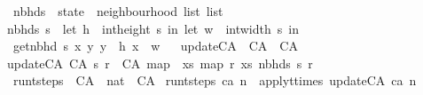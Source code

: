 \begin{isabellebody}
\isanewline
{}\isamarkupfalse%
\ nbhds\ {\isacharcolon}{\isacharcolon}\ {\isachardoublequoteopen}state\ {\isasymRightarrow}\ neighbourhood\ list\ list{\isachardoublequoteclose}\ \isanewline
{\isachardoublequoteopen}nbhds\ s\ {\isacharequal}\ {\isacharparenleft}let\ h\ {\isacharequal}\ {\isacharparenleft}int{\isacharunderscore}height\ s{\isacharparenright}{\isacharminus}{}\ in\ {\isacharparenleft}let\ w\ {\isacharequal}\ {\isacharparenleft}int{\isacharunderscore}width\ s{\isacharparenright}{\isacharminus}{}\ in\isanewline
\ {\isacharbrackleft}{\isacharbrackleft}get{\isacharunderscore}nbhd\ s\ x\ y{\isachardot}\ y\ {\isasymleftarrow}\ {\isacharbrackleft}{}{\isachardot}{\isachardot}h{\isacharbrackright}{\isacharbrackright}{\isachardot}\ x\ {\isasymleftarrow}\ {\isacharbrackleft}{}{\isachardot}{\isachardot}w{\isacharbrackright}{\isacharbrackright}{\isacharparenright}{\isacharparenright}{\isachardoublequoteclose}\isanewline
\isanewline
\ \isanewline
{}\isamarkupfalse%
\ update{\isacharunderscore}CA\ {\isacharcolon}{\isacharcolon}\ {\isachardoublequoteopen}CA\ {\isasymRightarrow}\ CA{\isachardoublequoteclose}\ \isanewline
{\isachardoublequoteopen}update{\isacharunderscore}CA\ {\isacharparenleft}CA\ s\ r{\isacharparenright}\ {\isacharequal}\ CA\ {\isacharparenleft}map\ {\isacharparenleft}{\isasymlambda}\ xs{\isachardot}\ map\ r\ xs{\isacharparenright}\ {\isacharparenleft}nbhds\ s{\isacharparenright}{\isacharparenright}\ r{\isachardoublequoteclose}\isanewline
\isanewline
{}\isamarkupfalse%
\ run{\isacharunderscore}t{\isacharunderscore}steps\ {\isacharcolon}{\isacharcolon}\ {\isachardoublequoteopen}CA\ {\isasymRightarrow}\ nat\ {\isasymRightarrow}\ CA{\isachardoublequoteclose}\ \isanewline
{\isachardoublequoteopen}run{\isacharunderscore}t{\isacharunderscore}steps\ ca\ n\ {\isacharequal}\ apply{\isacharunderscore}t{\isacharunderscore}times\ update{\isacharunderscore}CA\ ca\ n{\isachardoublequoteclose}\isanewline
%
\isadelimtheory
%
\endisadelimtheory
%
\isatagtheory
{}\isamarkupfalse%
%
\endisatagtheory
{\isafoldtheory}%
%
\isadelimtheory
%
\endisadelimtheory
%
\end{isabellebody}%
\endinput
